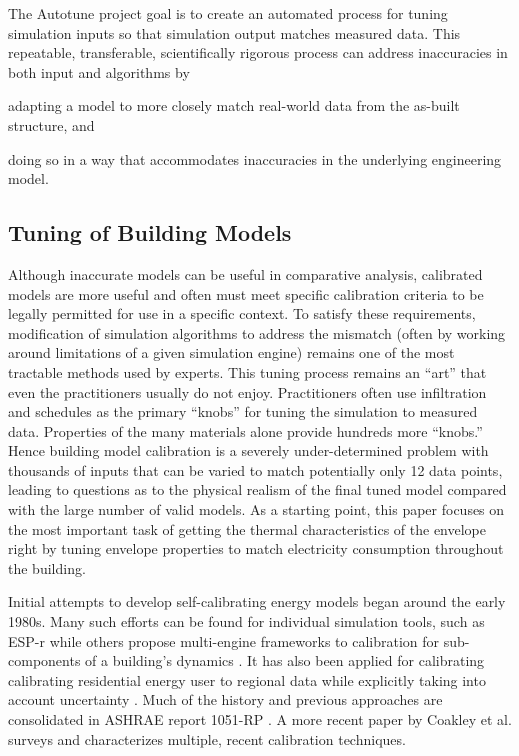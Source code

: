 \documentclass[preprint, review, 12pt]{elsarticle}
\begin{document}
The Autotune project \cite{cit:new2012} goal is to create an automated process for tuning simulation inputs so that simulation output matches measured data. This repeatable, transferable, scientifically rigorous process can address inaccuracies in both input and algorithms by 
\begin{inparaenum}[(1)]
\item adapting a model to more closely match real-world data from the as-built structure,  and 
\item doing so in a way that accommodates inaccuracies in the underlying engineering model.
\end{inparaenum}

\subsection{Tuning of Building Models}
Although inaccurate models can be useful in comparative analysis, calibrated models are more useful and often must meet specific calibration criteria to be legally permitted for use in a specific context. To satisfy these requirements, modification of simulation algorithms to address the mismatch (often by working around limitations of a given simulation engine) remains one of the most tractable methods used by experts. This tuning process remains an ``art'' that even the practitioners usually do not enjoy. Practitioners often use infiltration and schedules as the primary ``knobs'' for tuning the simulation to measured data. Properties of the many materials alone provide hundreds more ``knobs.'' Hence building model calibration is a severely under-determined problem with thousands of inputs that can be varied to match potentially only 12 data points, leading to questions as to the physical realism of the final tuned model compared with the large number of valid models. As a starting point, this paper focuses on the most important task of getting the thermal characteristics of the envelope right by tuning envelope properties to match electricity consumption throughout the building.

Initial attempts to develop self-calibrating energy models began around the early 1980s. Many such efforts can be found for individual simulation tools, such as ESP-r \cite{Strachan2008601} while others propose multi-engine frameworks to calibration for sub-components of a building's dynamics \cite{Murphy2013484}. It has also been applied for calibrating calibrating residential energy user to regional data while explicitly taking into account uncertainty \cite{vanRuijven2010269}. Much of the history and previous approaches are consolidated in ASHRAE report 1051-RP \cite{cit:reddy2006}. A more recent paper by Coakley et al. \cite{Coakley2014123} surveys and characterizes multiple, recent calibration techniques.
\end{document}
